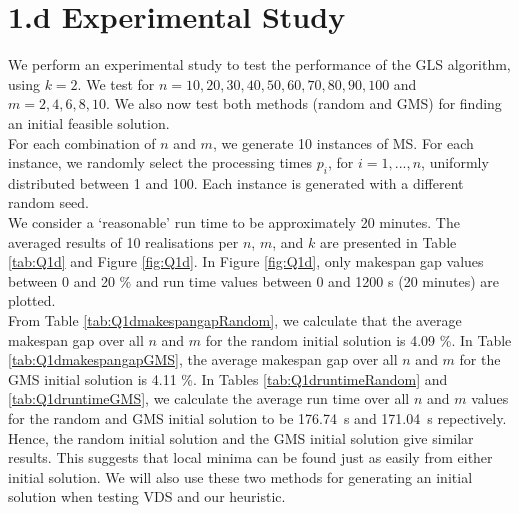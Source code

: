 \documentclass[12pt,a4paper,reqno]{article}
\begin{document}
\section*{1.d Experimental Study}
We perform an experimental study to test the performance of the GLS algorithm, using $k=2$. We test for $n=10,20,30,40,50,60,70,80,90,100$ and $m=2,4,6,8,10$. We also now test both methods (random and GMS) for finding an initial feasible solution. \\

For each combination of $n$ and $m$, we generate 10 instances of MS. For each instance, we randomly select the processing times $p_i$, for $i=1,...,n$, uniformly distributed between 1 and 100. Each instance is generated with a different random seed. \\

We consider a `reasonable' run time to be approximately 20 minutes. The averaged results of 10 realisations per $n$, $m$, and $k$ are presented in Table \ref{tab:Q1d} and Figure \ref{fig:Q1d}. In Figure \ref{fig:Q1d}, only makespan gap values between 0 and 20 \% and run time values between 0 and 1200 s (20 minutes) are plotted. \\

From Table \ref{tab:Q1dmakespangapRandom}, we calculate that the average makespan gap over all $n$ and $m$ for the random initial solution is 4.09 \%. In Table \ref{tab:Q1dmakespangapGMS}, the average makespan gap over all $n$ and $m$ for the GMS initial solution is 4.11 \%. In Tables  \ref{tab:Q1druntimeRandom} and \ref{tab:Q1druntimeGMS}, we calculate the average run time over all $n$ and $m$ values for the random and GMS initial solution to be 176.74~s and 171.04~s repectively. Hence, the random initial solution and the GMS initial solution give similar results. This suggests that local minima can be found just as easily from either initial solution. We will also use these two methods for generating an initial solution when testing VDS and our heuristic.
\end{document}
